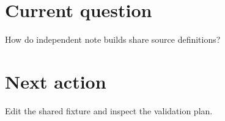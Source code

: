 \section*{Current question}
How do independent note builds share source definitions?
\section*{Next action}
Edit the shared fixture and inspect the validation plan.
